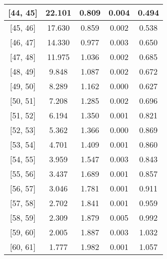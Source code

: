 \documentclass[12pt]{article}
\begin{document}
\begin{table}[]
\begin{tabular}{c|c|c|c|c|}
\multicolumn{1}{|c|}{{[}44,  45{]}}  & 22.101 & 0.809 & 0.004 & 0.494 \\ \hline 
\multicolumn{1}{|c|}{{[}45,  46{]}}  & 17.630 & 0.859 & 0.002 & 0.538 \\ \hline 
\multicolumn{1}{|c|}{{[}46,  47{]}}  & 14.330 & 0.977 & 0.003 & 0.650 \\ \hline 
\multicolumn{1}{|c|}{{[}47,  48{]}}  & 11.975 & 1.036 & 0.002 & 0.685 \\ \hline 
\multicolumn{1}{|c|}{{[}48,  49{]}}  & 9.848 & 1.087 & 0.002 & 0.672 \\ \hline 
\multicolumn{1}{|c|}{{[}49,  50{]}}  & 8.289 & 1.162 & 0.000 & 0.627 \\ \hline 
\multicolumn{1}{|c|}{{[}50,  51{]}}  & 7.208 & 1.285 & 0.002 & 0.696 \\ \hline 
\multicolumn{1}{|c|}{{[}51,  52{]}}  & 6.194 & 1.350 & 0.001 & 0.821 \\ \hline 
\multicolumn{1}{|c|}{{[}52,  53{]}}  & 5.362 & 1.366 & 0.000 & 0.869 \\ \hline 
\multicolumn{1}{|c|}{{[}53,  54{]}}  & 4.701 & 1.409 & 0.001 & 0.860 \\ \hline 
\multicolumn{1}{|c|}{{[}54,  55{]}}  & 3.959 & 1.547 & 0.003 & 0.843 \\ \hline 
\multicolumn{1}{|c|}{{[}55,  56{]}}  & 3.437 & 1.689 & 0.001 & 0.857 \\ \hline 
\multicolumn{1}{|c|}{{[}56,  57{]}}  & 3.046 & 1.781 & 0.001 & 0.911 \\ \hline 
\multicolumn{1}{|c|}{{[}57,  58{]}}  & 2.702 & 1.841 & 0.001 & 0.959 \\ \hline 
\multicolumn{1}{|c|}{{[}58,  59{]}}  & 2.309 & 1.879 & 0.005 & 0.992 \\ \hline 
\multicolumn{1}{|c|}{{[}59,  60{]}}  & 2.005 & 1.887 & 0.003 & 1.032 \\ \hline 
\multicolumn{1}{|c|}{{[}60,  61{]}}  & 1.777 & 1.982 & 0.001 & 1.057 \\ \hline 
\end{tabular}
\end{table}
\end{document}
